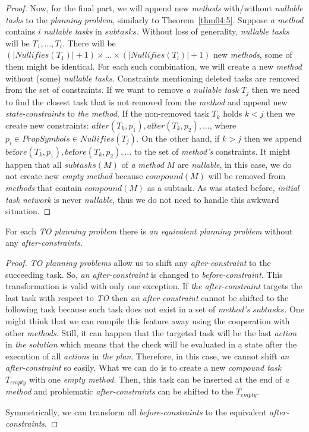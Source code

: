 \begin{proof}
    Now, for the final part, we will append new \emph{methods} with/without \emph{nullable tasks} to the \emph{planning problem}, similarly to Theorem~\ref{thm04:5}. Suppose \emph{a method} contains $i$ \emph{nullable tasks} in $subtasks$. Without loss of generality, \emph{nullable tasks} will be $T_1, \dots, T_i$. There will be $(|Nullifies(T_1)| + 1) \times \dots \times (|Nullifies(T_i)| + 1)$ new \emph{methods}, some of them might be identical. For each such combination, we will create a new \emph{method} without (some) \emph{nullable tasks}. Constraints mentioning deleted tasks are removed from the set of constraints. If we want to remove \emph{a nullable task} $T_j$ then we need to find the closest task that is not removed from the \emph{method} and append new \emph{state-constraints} to \emph{the method}. If the non-removed task $T_k$ holds $k < j$ then we create new constraints: $a\text{f}ter(T_k, p_1), a\text{f}ter(T_k, p_2), \dots$, where $p_i \in PropSymbols \in Nullifies(T_j)$. On the other hand, if $k > j$ then we append $be\text{f}ore(T_k, p_1), be\text{f}ore(T_k, p_2), \dots$ to the set of \emph{method's} constraints. It might happen that all $subtasks(M)$ of \emph{a method} $M$ are \emph{nullable}, in this case, we do not create new \emph{empty method} because $compound(M)$ will be removed from \emph{methods} that contain $compound(M)$ as a subtask. As was stated before, \emph{initial task network} is never \emph{nullable}, thus we do not need to handle this awkward situation.
\end{proof}

\begin{thm}\label{thm04:11}
    For each \emph{TO planning problem} there is \emph{an equivalent planning problem} without any \emph{after-constraints}.
\end{thm}
\begin{proof}
    \emph{TO planning problems} allow us to shift any \emph{after-constraint} to the succeeding task. So, \emph{an after-constraint} is changed to \emph{before-constraint}. This transformation is valid with only one exception. If \emph{the after-constraint} targets the last task with respect to \emph{TO} then \emph{an after-constraint} cannot be shifted to the following task because such task does not exist in a set of \emph{method's} $subtasks$. One might think that we can compile this feature away using the cooperation with other \emph{methods}. Still, it can happen that the targeted task will be the last \emph{action} in \emph{the solution} which means that the check will be evaluated in a state after the execution of all \emph{actions} in \emph{the plan}. Therefore, in this case, we cannot shift \emph{an after-constraint} so easily. What we can do is to create a new \emph{compound task} $T_{empty}$ with one \emph{empty method}. Then, this task can be inserted at the end of \emph{a method} and problematic \emph{after-constraints} can be shifted to the $T_{empty}$.

    Symmetrically, we can transform all \emph{before-constraints} to the equivalent \emph{after-constraints}.
\end{proof}

